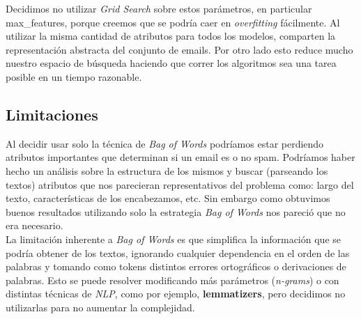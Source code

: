Decidimos no utilizar \textit{Grid Search} sobre estos parámetros, en particular max\_features, porque creemos que se podría caer en \textit{overfitting} fácilmente. Al utilizar la misma cantidad de atributos para todos los modelos, comparten la representación abstracta del conjunto de emails. Por otro lado esto reduce mucho nuestro espacio de búsqueda haciendo que correr los algoritmos sea una tarea posible en un tiempo razonable.\\

\subsection{Limitaciones}

Al decidir usar solo la técnica de \textit{Bag of Words} podríamos estar perdiendo atributos importantes que determinan si un email es o no spam. Podríamos haber hecho un análisis sobre la estructura de los mismos y buscar (parseando los textos) atributos que nos parecieran representativos del problema como: largo del texto, características de los encabezamos, etc. Sin embargo como obtuvimos buenos resultados utilizando solo la estrategia \textit{Bag of Words} nos pareció que no era necesario.   \\

La limitación inherente a \textit{Bag of Words} es que simplifica la información que se podría obtener de los textos, ignorando cualquier dependencia en el orden de las palabras y tomando como tokens distintos errores ortográficos o derivaciones de palabras. Esto se puede resolver modificando más parámetros (\textit{n-grams}) o con distintas técnicas de \textit{NLP}, como por ejemplo, \textbf{lemmatizers}, pero decidimos no utilizarlas para no aumentar la complejidad.
